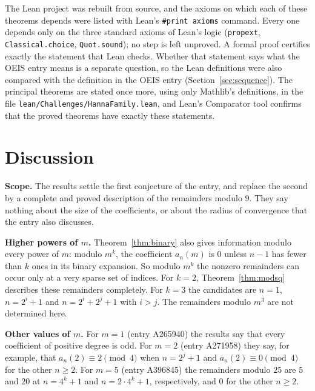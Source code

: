 \documentclass[11pt,a4paper]{article}
\theoremstyle{definition}
\theoremstyle{remark}
\newcommand{\para}[1]{\par\medskip\noindent\textbf{#1}\enspace}
\begin{document}
The Lean project was rebuilt from source, and the axioms on which each of these theorems depends were listed with
Lean's \texttt{\#print axioms} command. Every one depends only on the three standard axioms of Lean's logic
(\texttt{propext}, \texttt{Classical.choice}, \texttt{Quot.sound}); no step is left unproved. A formal proof certifies
exactly the statement that Lean checks. Whether that statement says what the OEIS entry means is a separate question,
so the Lean definitions were also compared with the definition in the OEIS entry
(Section~\ref{sec:sequence}). The principal theorems are stated once more, using only Mathlib's definitions, in the
file \texttt{lean/Challenges/HannaFamily.lean}, and Lean's Comparator tool confirms that the
proved theorems have exactly these statements.

\section{Discussion}\label{sec:discussion}

\para{Scope.} The results settle the first conjecture of the entry, and replace the second by a complete and proved
description of the remainders modulo $9$. They say nothing about the size of the coefficients, or about the radius of
convergence that the entry also discusses.

\para{Higher powers of $m$.} Theorem~\ref{thm:binary} also gives information modulo every power of $m$: modulo
$m^k$, the coefficient $a_n(m)$ is $0$ unless $n-1$ has fewer than $k$ ones in its binary expansion. So modulo $m^k$
the nonzero remainders can occur only at a very sparse set of indices. For $k=2$, Theorem~\ref{thm:modsq} describes these
remainders completely. For $k=3$ the candidates are $n=1$, $n=2^i+1$ and $n=2^i+2^j+1$ with $i>j$. The remainders modulo
$m^3$ are not determined here.

\para{Other values of $m$.} For $m=1$ (entry A265940) the results say that every coefficient of positive degree is odd. For $m=2$
(entry A271958) they say, for example, that $a_n(2)\equiv2\pmod 4$ when $n=2^j+1$ and $a_n(2)\equiv0\pmod4$ for the
other $n\ge2$. For $m=5$ (entry A396845) the remainders modulo $25$ are $5$ and $20$ at $n=4^k+1$ and $n=2\cdot4^k+1$,
respectively, and $0$ for the other $n\ge2$.
\end{document}

